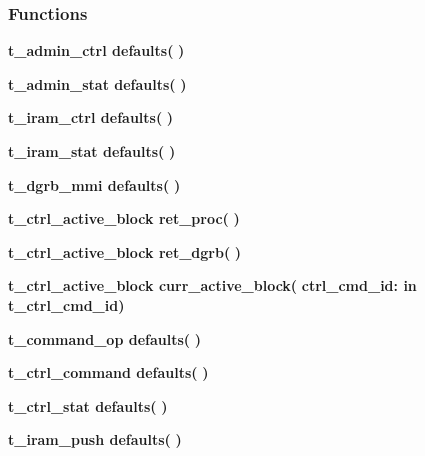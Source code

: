 \subsubsection*{Functions}
 \begin{DoxyCompactItemize}
\item 
{\bfseries {\bfseries {\bfseries {\bf t\+\_\+admin\+\_\+ctrl}} \textcolor{vhdlchar}{ }}} {\bf defaults}{\bfseries  ( }{\bfseries  )} 
\item 
{\bfseries {\bfseries {\bfseries {\bf t\+\_\+admin\+\_\+stat}} \textcolor{vhdlchar}{ }}} {\bf defaults}{\bfseries  ( }{\bfseries  )} 
\item 
{\bfseries {\bfseries {\bfseries {\bf t\+\_\+iram\+\_\+ctrl}} \textcolor{vhdlchar}{ }}} {\bf defaults}{\bfseries  ( }{\bfseries  )} 
\item 
{\bfseries {\bfseries {\bfseries {\bf t\+\_\+iram\+\_\+stat}} \textcolor{vhdlchar}{ }}} {\bf defaults}{\bfseries  ( }{\bfseries  )} 
\item 
{\bfseries {\bfseries {\bfseries {\bf t\+\_\+dgrb\+\_\+mmi}} \textcolor{vhdlchar}{ }}} {\bf defaults}{\bfseries  ( }{\bfseries  )} 
\item 
{\bfseries {\bfseries {\bfseries {\bf t\+\_\+ctrl\+\_\+active\+\_\+block}} \textcolor{vhdlchar}{ }}} {\bf ret\+\_\+proc}{\bfseries  ( }{\bfseries  )} 
\item 
{\bfseries {\bfseries {\bfseries {\bf t\+\_\+ctrl\+\_\+active\+\_\+block}} \textcolor{vhdlchar}{ }}} {\bf ret\+\_\+dgrb}{\bfseries  ( }{\bfseries  )} 
\item 
{\bfseries {\bfseries {\bfseries {\bf t\+\_\+ctrl\+\_\+active\+\_\+block}} \textcolor{vhdlchar}{ }}} {\bf curr\+\_\+active\+\_\+block}{\bfseries  ( }{\bfseries \textcolor{vhdlchar}{ctrl\+\_\+cmd\+\_\+id\+: }\textcolor{stringliteral}{in }\textcolor{vhdlchar}{t\+\_\+ctrl\+\_\+cmd\+\_\+id}}{\bfseries  )} 
\item 
{\bfseries {\bfseries {\bfseries {\bf t\+\_\+command\+\_\+op}} \textcolor{vhdlchar}{ }}} {\bf defaults}{\bfseries  ( }{\bfseries  )} 
\item 
{\bfseries {\bfseries {\bfseries {\bf t\+\_\+ctrl\+\_\+command}} \textcolor{vhdlchar}{ }}} {\bf defaults}{\bfseries  ( }{\bfseries  )} 
\item 
{\bfseries {\bfseries {\bfseries {\bf t\+\_\+ctrl\+\_\+stat}} \textcolor{vhdlchar}{ }}} {\bf defaults}{\bfseries  ( }{\bfseries  )} 
\item 
{\bfseries {\bfseries {\bfseries {\bf t\+\_\+iram\+\_\+push}} \textcolor{vhdlchar}{ }}} {\bf defaults}{\bfseries  ( }{\bfseries  )} 

\end{DoxyCompactItemize}
